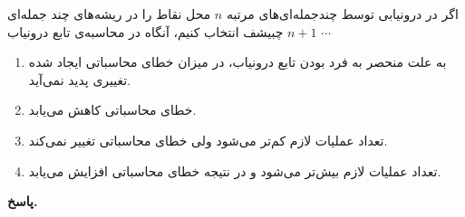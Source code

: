 اگر در درونیابی توسط چندجمله‌ای‌های مرتبه 
\(n\)
محل نقاط را در ریشه‌های چند جمله‌ای 
\(n+1\)
چبیشف انتخاب کنیم، آنگاه در محاسبه‌ی تابع درونیاب 
\(\cdots\)
\vspace*{-.3cm}
 \begin{enumerate}
	\item به علت منحصر به فرد بودن تابع درونیاب، در میزان خطای محاسباتی ایجاد شده تغییری پدید نمی‌آید.
	\item خطای محاسباتی کاهش می‌یابد.
	\item تعداد عملیات لازم کم‌تر می‌شود ولی خطای محاسباتی تغییر نمی‌کند.
	\item تعداد عملیات لازم بیش‌‌‌تر می‌شود و در نتیجه خطای محاسباتی افزایش می‌یابد.
\end{enumerate}

\begin{answer}

	\textbf{پاسخ.}
	
\end{answer}
